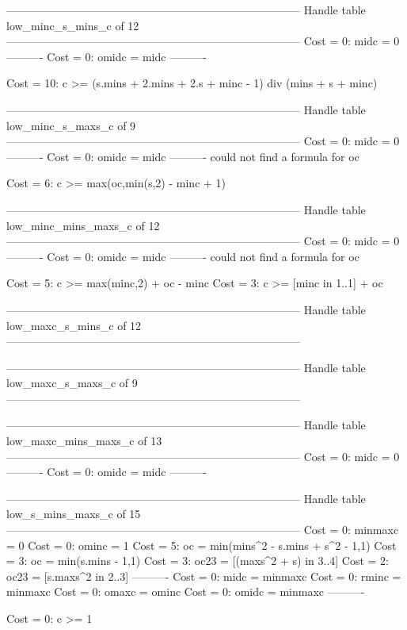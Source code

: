 --------------------------------------------------------------------------------
Handle table low_minc_s_mins_c of 12
--------------------------------------------------------------------------------
Cost =  0:  midc  = 0
----------
Cost =  0:  omidc = midc
----------

Cost = 10:  c >= (s.mins + 2.mins + 2.s + minc - 1) div (mins + s + minc)

--------------------------------------------------------------------------------
Handle table low_minc_s_maxs_c of 9
--------------------------------------------------------------------------------
Cost =  0:  midc  = 0
----------
Cost =  0:  omidc = midc
----------
could not find a formula for oc

Cost =  6:  c >= max(oc,min(s,2) - minc + 1)

--------------------------------------------------------------------------------
Handle table low_minc_mins_maxs_c of 12
--------------------------------------------------------------------------------
Cost =  0:  midc  = 0
----------
Cost =  0:  omidc = midc
----------
could not find a formula for oc

Cost =  5:  c >= max(minc,2) + oc - minc
Cost =  3:  c >= [minc in 1..1] + oc

--------------------------------------------------------------------------------
Handle table low_maxc_s_mins_c of 12
--------------------------------------------------------------------------------


--------------------------------------------------------------------------------
Handle table low_maxc_s_maxs_c of 9
--------------------------------------------------------------------------------


--------------------------------------------------------------------------------
Handle table low_maxc_mins_maxs_c of 13
--------------------------------------------------------------------------------
Cost =  0:  midc  = 0
----------
Cost =  0:  omidc = midc
----------


--------------------------------------------------------------------------------
Handle table low_s_mins_maxs_c of 15
--------------------------------------------------------------------------------
Cost =  0:  minmaxc = 0
Cost =  0:  ominc   = 1
Cost =  5:  oc      = min(mins^2 - s.mins + s^2 - 1,1)
Cost =  3:  oc      = min(s.mins - 1,1)
Cost =  3:  oc23    = [(maxs^2 + s) in 3..4]
Cost =  2:  oc23    = [s.maxs^2 in 2..3]
----------
Cost =  0:  midc    = minmaxc
Cost =  0:  rminc   = minmaxc
Cost =  0:  omaxc   = ominc
Cost =  0:  omidc   = minmaxc
----------

Cost =  0:  c >= 1
